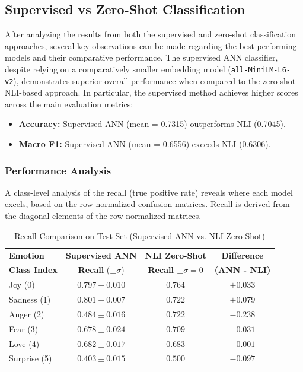 \documentclass[runningheads]{llncs}
\begin{document}
\subsection{Supervised vs Zero-Shot Classification}
After analyzing the results from both the supervised and zero-shot classification approaches, several key observations can be made regarding the best performing models and their comparative performance.
The supervised ANN classifier, despite relying on a comparatively smaller embedding model (\texttt{all-MiniLM-L6-v2}), demonstrates superior overall performance when compared to the zero-shot NLI-based approach. In particular, the supervised method achieves higher scores across the main evaluation metrics:
\begin{itemize}
    \item \textbf{Accuracy:} Supervised ANN (mean = 0.7315) outperforms NLI (0.7045).
    \item \textbf{Macro F1:} Supervised ANN (mean = 0.6556) exceeds NLI (0.6306).
\end{itemize}

\subsubsection{Performance Analysis}
A class-level analysis of the recall (true positive rate) reveals where each model excels, based on the row-normalized confusion matrices. Recall is derived from the diagonal elements of the row-normalized matrices.

\begin{table}[H]
\centering
\caption{Recall Comparison on Test Set (Supervised ANN vs. NLI Zero-Shot)}
\label{tab:recall_comparison}
\begin{tabular}{lccc}
\hline
\textbf{Emotion} & \textbf{Supervised ANN} & \textbf{NLI Zero-Shot} & \textbf{Difference} \\
\textbf{Class Index} & \textbf{Recall} ($\pm \sigma$) & \textbf{Recall $\pm \sigma = 0$} & \textbf{(ANN - NLI)} \\
\hline
Joy (0) & $0.797 \pm 0.010$ & $0.764$ & $+0.033$ \\
Sadness (1) & $0.801 \pm 0.007$ & $0.722$ & $\mathbf{+0.079}$ \\
Anger (2) & $0.484 \pm 0.016$ & $0.722$ & $\mathbf{-0.238}$ \\
Fear (3) & $0.678 \pm 0.024$ & $0.709$ & $-0.031$ \\
Love (4) & $0.682 \pm 0.017$ & $0.683$ & $-0.001$ \\
Surprise (5) & $0.403 \pm 0.015$ & $0.500$ & $\mathbf{-0.097}$ \\
\hline
\end{tabular}
\end{table}
\end{document}
